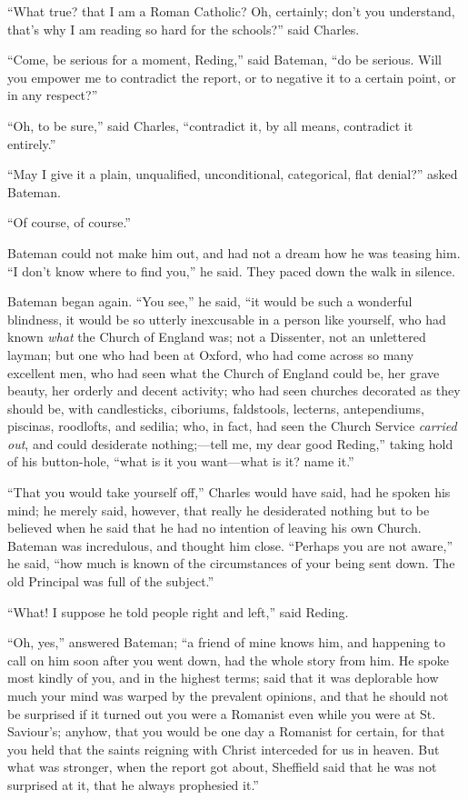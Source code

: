 ``What true? that I am a Roman Catholic? Oh, certainly; don't
you understand, that's why I am reading so hard for the schools?''
said Charles.

``Come, be serious for a moment, Reding,'' said Bateman,
``do be serious. Will you empower me to contradict the report, or
to negative it to a certain point, or in any respect?''

``Oh, to be sure,'' said Charles, ``contradict it, by
all means, contradict it entirely.''

``May I give it a plain, unqualified, unconditional,
categorical, flat denial?'' asked Bateman.

``Of course, of course.''

Bateman could not make him out, and had not a dream how he was
teasing him. ``I don't know where to find you,'' he said. They
paced down the walk in silence.

Bateman began again. ``You see,'' he said, ``it would
be such a wonderful blindness, it would be so utterly inexcusable in a
person like yourself, who had known \emph{what} the Church of England
was; not a Dissenter, not an unlettered layman; but one who had
been at Oxford, who had come across so many excellent men, who had
seen what the Church of England could be, her grave beauty, her
orderly and decent activity; who had seen churches decorated as they
should be, with candlesticks, ciboriums, faldstools, lecterns,
antependiums, piscinas, roodlofts, and sedilia; who, in fact, had seen
the Church Service \emph{carried out}, and could desiderate nothing;—tell
me, my dear good Reding,'' taking hold of his button-hole,
``what is it you want—what is it? name it.''

``That you would take yourself off,'' Charles would have
said, had he spoken his mind; he merely said, however, that really he
desiderated nothing but to be believed when he said that he had no
intention of leaving his own Church. Bateman was incredulous, and
thought him close. ``Perhaps you are not aware,'' he said,
``how much is known of the circumstances of your being sent down.
The old Principal was full of the subject.''

``What! I suppose he told people right and left,'' said
Reding.

``Oh, yes,'' answered Bateman; ``a friend of mine knows
him, and happening to call on him soon after you went down, had the
whole story from him. He spoke most kindly of you, and in the highest
terms; said that it was deplorable how much your mind was warped by
the prevalent opinions, and that he should not be surprised if it
turned out you were a Romanist even while you were at St. Saviour's;
anyhow, that you would be one day a Romanist for certain, for that
you held that the saints reigning with Christ interceded for us
in heaven. But what was stronger, when the report got about, Sheffield
said that he was not surprised at it, that he always prophesied
it.''

